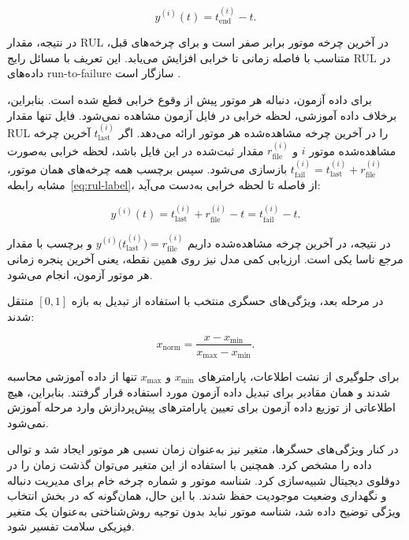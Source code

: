 \begin{equation}
	\label{eq:rul-label}
	y^{(i)}(t)
	=
	t_{\mathrm{end}}^{(i)}-t.
\end{equation}

در نتیجه، مقدار \gls{RUL} در آخرین چرخه موتور برابر صفر است و
برای چرخه‌های قبل، متناسب با فاصله زمانی تا خرابی افزایش می‌یابد.
این تعریف با مسائل رایج 
\gls{RUL}
در داده‌های
\gls{run-to-failure}
 سازگار است \cite{NASA2007C-MAPSS,heimes2008recurrent}.


برای داده آزمون، دنباله هر موتور پیش از وقوع خرابی قطع شده است.
بنابراین، برخلاف داده آموزشی، لحظه خرابی در فایل آزمون مشاهده نمی‌شود.
فایل  تنها مقدار \gls{RUL} را در آخرین چرخه
مشاهده‌شده هر موتور ارائه می‌دهد.
اگر $t_{\mathrm{last}}^{(i)}$ آخرین چرخه مشاهده‌شده موتور $i$
و $r_{\mathrm{file}}^{(i)}$ مقدار ثبت‌شده در این فایل باشد،
لحظه خرابی به‌صورت
$t_{\mathrm{fail}}^{(i)}=t_{\mathrm{last}}^{(i)}+r_{\mathrm{file}}^{(i)}$
بازسازی می‌شود.
سپس برچسب همه چرخه‌های همان موتور، مشابه رابطه~\eqref{eq:rul-label}،
از فاصله تا لحظه خرابی به‌دست می‌آید:

\begin{equation}
	\label{eq:rul-test}
	y^{(i)}(t)
	=
	t_{\mathrm{last}}^{(i)}
	+
	r_{\mathrm{file}}^{(i)}
	-
	t
	=
	t_{\mathrm{fail}}^{(i)}-t.
\end{equation}

در نتیجه، در آخرین چرخه مشاهده‌شده داریم
$y^{(i)}\bigl(t_{\mathrm{last}}^{(i)}\bigr)=r_{\mathrm{file}}^{(i)}$
و برچسب با مقدار مرجع ناسا یکی است.
ارزیابی کمی مدل نیز روی همین نقطه، یعنی آخرین پنجره زمانی هر موتور
آزمون، انجام می‌شود.

در مرحله بعد، ویژگی‌های حسگری منتخب با استفاده از تبدیل
 به بازه $[0,1]$ منتقل شدند:

\begin{equation}
	\label{eq:normalization}
	x_{\mathrm{norm}}
	=
	\frac{x-x_{\min}}
	{x_{\max}-x_{\min}}.
\end{equation}

برای جلوگیری از نشت اطلاعات، پارامترهای $x_{\min}$ و $x_{\max}$
تنها از داده آموزشی محاسبه شدند و همان مقادیر برای تبدیل داده
آزمون مورد استفاده قرار گرفتند. بنابراین، هیچ اطلاعاتی از توزیع
داده آزمون برای تعیین پارامترهای پیش‌پردازش وارد مرحله آموزش
نمی‌شود.


در کنار ویژگی‌های حسگرها، متغیر  نیز به‌عنوان
زمان نسبی هر موتور ایجاد شد و توالی داده را مشخص کرد. همچنین با استفاده از این متغیر می‌توان گذشت زمان را در دوقلوی دیجیتال شبیه‌سازی کرد. شناسه موتور و شماره چرخه خام برای مدیریت دنباله و نگهداری وضعیت موجودیت حفظ شدند. با این حال، همان‌گونه که در بخش انتخاب ویژگی توضیح داده شد،
شناسه موتور نباید بدون توجیه روش‌شناختی به‌عنوان یک متغیر فیزیکی
سلامت تفسیر شود.

